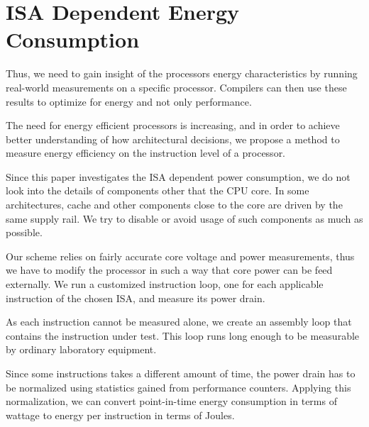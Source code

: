 \section{ISA Dependent Energy Consumption}



Thus, we need to gain insight of the processors energy characteristics by
running real-world measurements on a specific processor. Compilers can then use
these results to optimize for energy and not only performance.





The need for energy efficient processors is increasing, and in order to achieve
better understanding of how architectural decisions, we propose a method to
measure energy efficiency on the instruction level of a processor.

Since this paper investigates the ISA dependent power consumption, we do not
look into the details of components other that the CPU core. In some
architectures, cache and other components close to the core are driven by the
same supply rail\cite{rusu200765}. We try to disable or avoid usage of such
components as much as possible.

















Our scheme relies on fairly accurate core voltage and power measurements, thus
we have to modify the processor in such a way that core power can be feed
externally. We run a customized instruction loop, one for each applicable
instruction of the chosen ISA, and measure its power drain.

As each instruction cannot be measured alone, we create an assembly loop that
contains the instruction under test. This loop runs long enough to be measurable
by ordinary laboratory equipment.

Since some instructions takes a different amount of time, the power drain has to be
normalized using statistics gained from performance counters. Applying this
normalization, we can convert point-in-time energy consumption in terms of
wattage to energy per instruction in terms of Joules.

